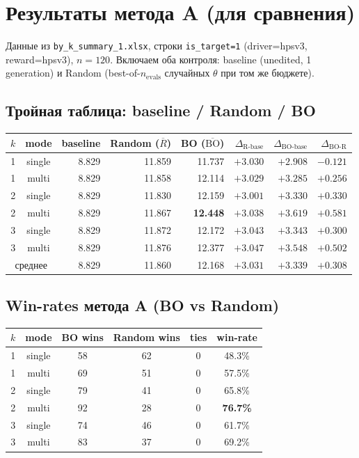 \documentclass[11pt,a4paper]{article}
\begin{document}
\section{Результаты метода A (для сравнения)}

Данные из \texttt{by\_k\_summary\_1.xlsx}, строки \texttt{is\_target=1}
(driver=hpsv3, reward=hpsv3), $n=120$. Включаем оба контроля: baseline
(unedited, 1 generation) и Random (best-of-$n_\text{evals}$ случайных
$\theta$ при том же бюджете).

\subsection{Тройная таблица: baseline / Random / BO}

\begin{center}
\renewcommand{\arraystretch}{1.15}
\footnotesize
\begin{tabular}{ccrrrrrr}
\toprule
$k$ & mode & baseline & Random ($\overline{R}$) & BO ($\overline{\text{BO}}$) &
$\Delta_\text{R-base}$ & $\Delta_\text{BO-base}$ & $\Delta_\text{BO-R}$ \\
\midrule
1 & single & 8.829 & 11.859 & 11.737 & $+3.030$ & $+2.908$ & $-0.121$ \\
1 & multi  & 8.829 & 11.858 & 12.114 & $+3.029$ & $+3.285$ & $+0.256$ \\
2 & single & 8.829 & 11.830 & 12.159 & $+3.001$ & $+3.330$ & $+0.330$ \\
2 & multi  & 8.829 & 11.867 & \textbf{12.448} & $+3.038$ & $\bm{+3.619}$ & $+0.581$ \\
3 & single & 8.829 & 11.872 & 12.172 & $+3.043$ & $+3.343$ & $+0.300$ \\
3 & multi  & 8.829 & 11.876 & 12.377 & $+3.047$ & $+3.548$ & $+0.502$ \\
\midrule
\multicolumn{2}{c}{среднее} & 8.829 & 11.860 & 12.168 & $+3.031$ & $+3.339$ & $+0.308$ \\
\bottomrule
\end{tabular}
\end{center}

\subsection{Win-rates метода A (BO vs Random)}

\begin{center}
\begin{tabular}{cccccc}
\toprule
$k$ & mode & BO wins & Random wins & ties & win-rate \\
\midrule
1 & single &  58 & 62 & 0 & 48.3\% \\
1 & multi  &  69 & 51 & 0 & 57.5\% \\
2 & single &  79 & 41 & 0 & 65.8\% \\
2 & multi  &  92 & 28 & 0 & \textbf{76.7\%} \\
3 & single &  74 & 46 & 0 & 61.7\% \\
3 & multi  &  83 & 37 & 0 & 69.2\% \\
\bottomrule
\end{tabular}
\end{center}
\end{document}
